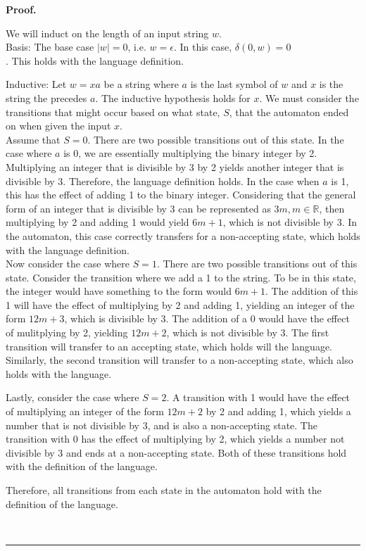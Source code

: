 \documentclass{article}%
\newenvironment{proof}[1][Proof]{\noindent\textbf{#1.} }{\ \rule{0.5em}{0.5em}}
\begin{document}
\begin{proof}

    We will induct on the length of an input string $w$.\\

    Basis: The base case $|w| = 0$, i.e. $w = \epsilon$. In this case, $\delta(0, w) = 0$\\. This holds with the language definition.

    Inductive: Let $w=xa$ be a string where $a$ is the last symbol of $w$ and $x$ is the string the precedes $a$. The inductive hypothesis holds for
    $x$. We must consider the transitions that might occur based on what state, $S$, that the automaton ended on when given the input $x$.\\

    Assume that $S=0$. There are two possible transitions out of this state. In the case where $a$ is 0, we are essentially multiplying the binary
    integer by 2. Multiplying an integer that is divisible by 3 by 2 yields another integer that is divisible by 3. Therefore, the language definition
    holds. In the case when $a$ is 1, this has the effect of adding 1 to the binary integer. Considering that the general form of an integer that is
    divisible by 3 can be represented as $3m, m \in \mathbb{R}$, then multiplying by 2 and adding 1 would yield $6m + 1$, which is not divisible by 3. In the automaton,
    this case correctly transfers for a non-accepting state, which holds with the language definition.\\

    Now consider the case where $S=1$. There are two possible transitions out of this state. Consider the transition where we add a 1 to the string. To be
    in this state, the integer would have something to the form would $6m + 1$. The addition of this 1 will have the effect of multiplying by 2 and adding 1, yielding
    an integer of the form $12m + 3$, which is divisible by 3. The addition of a 0 would have the effect of mulitplying by 2, yielding $12m + 2$, which is not divisible
    by 3. The first transition will transfer to an accepting state, which holds will the language. Similarly, the second transition will transfer to a non-accepting state,
    which also holds with the language.

    Lastly, consider the case where $S = 2$. A transition with 1 would have the effect of multiplying an integer of the form $12m + 2$ by 2 and adding 1, which yields a
    number that is not divisible by 3, and is also a non-accepting state. The transition with 0 has the effect of multiplying by 2, which yields a number not divisible by 3
    and ends at a non-accepting state. Both of these transitions hold with the definition of the language.

    Therefore, all transitions from each state in the automaton hold with the definition of the language.

\end{proof}
\end{document}
